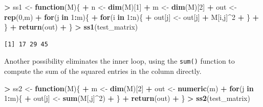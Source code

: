 \documentclass[
]{krantz}
\makeatletter
\newenvironment{Shaded}{\begin{snugshade}}{\end{snugshade}}
\newcommand{\ControlFlowTok}[1]{\textcolor[rgb]{0.27,0.27,0.27}{\textbf{#1}}}
\newcommand{\DecValTok}[1]{\textcolor[rgb]{0.06,0.06,0.06}{#1}}
\newcommand{\KeywordTok}[1]{\textcolor[rgb]{0.27,0.27,0.27}{\textbf{#1}}}
\newcommand{\NormalTok}[1]{#1}
\newcommand{\OperatorTok}[1]{\textcolor[rgb]{0.43,0.43,0.43}{\textbf{#1}}}
\newcommand{\StringTok}[1]{\textcolor[rgb]{0.5,0.5,0.5}{#1}}
\newenvironment{kframe}{%
\medskip{}
\setlength{\fboxsep}{.8em}
 \def\at@end@of@kframe{}%
 \ifinner\ifhmode%
  \def\at@end@of@kframe{\end{minipage}}%
  \begin{minipage}{\columnwidth}%
 \fi\fi%
 \def\FrameCommand##1{\hskip\@totalleftmargin \hskip-\fboxsep
 \colorbox{shadecolor}{##1}\hskip-\fboxsep
     \hskip-\linewidth \hskip-\@totalleftmargin \hskip\columnwidth}%
 \MakeFramed {\advance\hsize-\width
   \@totalleftmargin\z@ \linewidth\hsize
   \@setminipage}}%
 {\par\unskip\endMakeFramed%
 \at@end@of@kframe}
\renewenvironment{Shaded}{\begin{kframe}}{\end{kframe}}
\makeatother
\begin{document}
\begin{Shaded}
\begin{Highlighting}[]
\OperatorTok{\textgreater{}}\StringTok{ }\NormalTok{ss1 \textless{}{-}}\StringTok{ }\ControlFlowTok{function}\NormalTok{(M)\{}
\OperatorTok{+}\StringTok{     }\NormalTok{n \textless{}{-}}\StringTok{ }\KeywordTok{dim}\NormalTok{(M)[}\DecValTok{1}\NormalTok{]}
\OperatorTok{+}\StringTok{     }\NormalTok{m \textless{}{-}}\StringTok{ }\KeywordTok{dim}\NormalTok{(M)[}\DecValTok{2}\NormalTok{]}
\OperatorTok{+}\StringTok{     }\NormalTok{out \textless{}{-}}\StringTok{ }\KeywordTok{rep}\NormalTok{(}\DecValTok{0}\NormalTok{,m)}
\OperatorTok{+}\StringTok{     }\ControlFlowTok{for}\NormalTok{(j }\ControlFlowTok{in} \DecValTok{1}\OperatorTok{:}\NormalTok{m)\{}
\OperatorTok{+}\StringTok{         }\ControlFlowTok{for}\NormalTok{(i }\ControlFlowTok{in} \DecValTok{1}\OperatorTok{:}\NormalTok{n)\{}
\OperatorTok{+}\StringTok{             }\NormalTok{out[j] \textless{}{-}}\StringTok{ }\NormalTok{out[j] }\OperatorTok{+}\StringTok{ }\NormalTok{M[i,j]}\OperatorTok{\^{}}\DecValTok{2}
\OperatorTok{+}\StringTok{         }\NormalTok{\} }
\OperatorTok{+}\StringTok{     }\NormalTok{\}}
\OperatorTok{+}\StringTok{     }\KeywordTok{return}\NormalTok{(out)}
\OperatorTok{+}\StringTok{ }\NormalTok{\}}
\OperatorTok{\textgreater{}}\StringTok{ }\KeywordTok{ss1}\NormalTok{(test\_matrix)}
\end{Highlighting}
\end{Shaded}

\begin{verbatim}
[1] 17 29 45
\end{verbatim}

Another possibility eliminates the inner loop, using the \texttt{sum()} function to compute the sum of the squared entries in the column directly.

\begin{Shaded}
\begin{Highlighting}[]
\OperatorTok{\textgreater{}}\StringTok{ }\NormalTok{ss2 \textless{}{-}}\StringTok{ }\ControlFlowTok{function}\NormalTok{(M)\{}
\OperatorTok{+}\StringTok{     }\NormalTok{m \textless{}{-}}\StringTok{ }\KeywordTok{dim}\NormalTok{(M)[}\DecValTok{2}\NormalTok{]}
\OperatorTok{+}\StringTok{     }\NormalTok{out \textless{}{-}}\StringTok{ }\KeywordTok{numeric}\NormalTok{(m)}
\OperatorTok{+}\StringTok{     }\ControlFlowTok{for}\NormalTok{(j }\ControlFlowTok{in} \DecValTok{1}\OperatorTok{:}\NormalTok{m)\{}
\OperatorTok{+}\StringTok{         }\NormalTok{out[j] \textless{}{-}}\StringTok{ }\KeywordTok{sum}\NormalTok{(M[,j]}\OperatorTok{\^{}}\DecValTok{2}\NormalTok{)}
\OperatorTok{+}\StringTok{     }\NormalTok{\}}
\OperatorTok{+}\StringTok{     }\KeywordTok{return}\NormalTok{(out) }
\OperatorTok{+}\StringTok{ }\NormalTok{\}}
\OperatorTok{\textgreater{}}\StringTok{ }\KeywordTok{ss2}\NormalTok{(test\_matrix)}
\end{Highlighting}
\end{Shaded}
\end{document}
